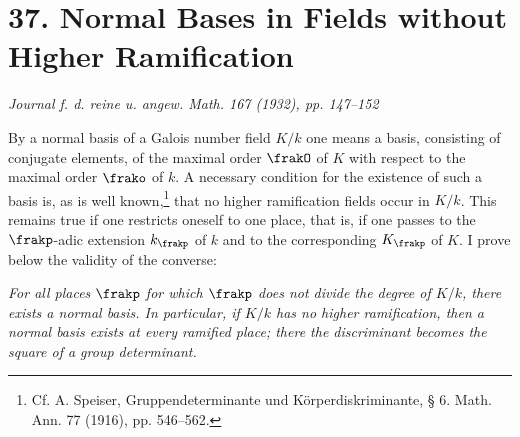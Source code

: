 \section*{37. Normal Bases in Fields without Higher Ramification}

\begin{center}
\emph{Journal f. d. reine u. angew. Math. 167 (1932), pp. 147--152}
\end{center}

By a normal basis of a Galois number field \(K/k\) one means a basis, consisting of conjugate elements, of the maximal order \(\frakO\) of \(K\) with respect to the maximal order \(\frako\) of \(k\). A necessary condition for the existence of such a basis is, as is well known,\footnote{Cf. A. Speiser, Gruppendeterminante und Körperdiskriminante, § 6. Math. Ann. 77 (1916), pp. 546--562.} that no higher ramification fields occur in \(K/k\). This remains true if one restricts oneself to one place, that is, if one passes to the \(\frakp\)-adic extension \(k_\frakp\) of \(k\) and to the corresponding \(K_\frakp\) of \(K\). I prove below the validity of the converse:

\emph{For all places \(\frakp\) for which \(\frakp\) does not divide the degree of \(K/k\), there exists a normal basis. In particular, if \(K/k\) has no higher ramification, then a normal basis exists at every ramified place; there the discriminant becomes the square of a group determinant.}

